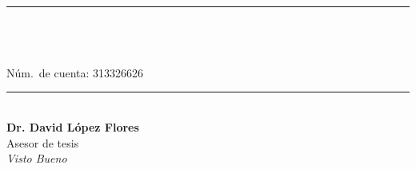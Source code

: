 \begin{minipage}[t]{0.45\textwidth}
  \rule{\textwidth}{0.6pt}\\[0.2cm]
  \textbf{\FirmanteName}\\
  {\small \FirmanteCargo}\\
  {\small Núm.\ de cuenta: 313326626} %
\end{minipage}%
\hfill
\begin{minipage}[t]{0.45\textwidth}
  \rule{\textwidth}{0.6pt}\\[0.2cm]
  \textbf{Dr. David López Flores}\\  %
  {\small Asesor de tesis}\\
  {\small \textit{Visto Bueno}}
\end{minipage}
